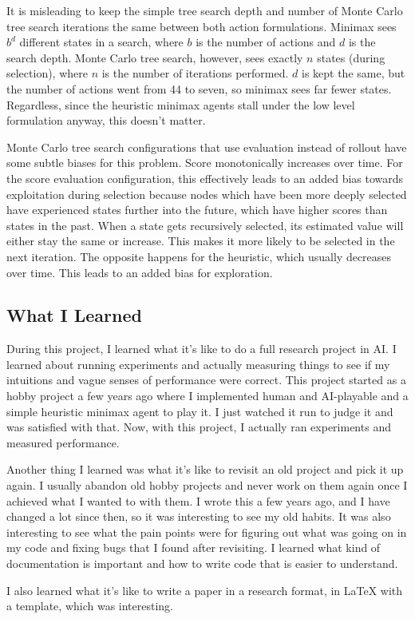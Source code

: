\documentclass[letterpaper]{article} %
\begin{document}
It is misleading to keep the simple tree search depth and number of Monte Carlo tree search iterations the same between both action formulations. Minimax sees \(b^{d}\) different states in a search, where \(b\) is the number of actions and \(d\) is the search depth. Monte Carlo tree search, however, sees exactly \(n\) states (during selection), where \(n\) is the number of iterations performed. \(d\) is kept the same, but the number of actions went from 44 to seven, so minimax sees far fewer states. Regardless, since the heuristic minimax agents stall under the low level formulation anyway, this doesn't matter.

Monte Carlo tree search configurations that use evaluation instead of rollout have some subtle biases for this problem. Score monotonically increases over time. For the score evaluation configuration, this effectively leads to an added bias towards exploitation during selection because nodes which have been more deeply selected have experienced states further into the future, which have higher scores than states in the past. When a state gets recursively selected, its estimated value will either stay the same or increase. This makes it more likely to be selected in the next iteration. The opposite happens for the heuristic, which usually decreases over time. This leads to an added bias for exploration.

\subsection{What I Learned}

During this project, I learned what it's like to do a full research project in AI. I learned about running experiments and actually measuring things to see if my intuitions and vague senses of performance were correct. This project started as a hobby project a few years ago where I implemented human and AI-playable \tetris{} and a simple heuristic minimax agent to play it. I just watched it run to judge it and was satisfied with that. Now, with this project, I actually ran experiments and measured performance.

Another thing I learned was what it's like to revisit an old project and pick it up again. I usually abandon old hobby projects and never work on them again once I achieved what I wanted to with them. I wrote this a few years ago, and I have changed a lot since then, so it was interesting to see my old habits. It was also interesting to see what the pain points were for figuring out what was going on in my code and fixing bugs that I found after revisiting. I learned what kind of documentation is important and how to write code that is easier to understand.

I also learned what it's like to write a paper in a research format, in \LaTeX{} with a template, which was interesting.
\end{document}
